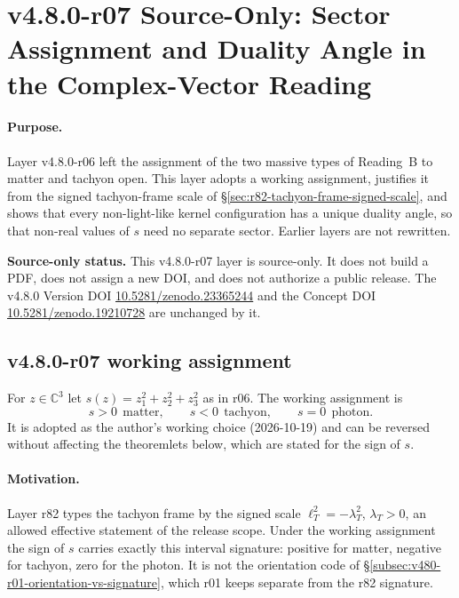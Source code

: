 
\clearpage
\section*{v4.8.0-r07 Source-Only: Sector Assignment and Duality Angle in the Complex-Vector Reading}
\label{sec:v480-r07-sector-assignment}

\paragraph{Purpose.}
Layer v4.8.0-r06 left the assignment of the two massive types of Reading~B to matter and tachyon
open.  This layer adopts a working assignment, justifies it from the signed tachyon-frame scale of
\S\ref{sec:r82-tachyon-frame-signed-scale}, and shows that every non-light-like kernel configuration
has a unique duality angle, so that non-real values of \(s\) need no separate sector.  Earlier
layers are not rewritten.

\noindent\textbf{Source-only status.}
This v4.8.0-r07 layer is source-only.  It does not build a PDF, does not assign a new DOI,
and does not authorize a public release.  The v4.8.0 Version DOI
\href{https://doi.org/10.5281/zenodo.23365244}{10.5281/zenodo.23365244} and the Concept DOI
\href{https://doi.org/10.5281/zenodo.19210728}{10.5281/zenodo.19210728} are unchanged by it.

\subsection*{v4.8.0-r07 working assignment}
\label{subsec:v480-r07-assignment}

For \(z\in\mathbb C^3\) let \(s(z)=z_1^2+z_2^2+z_3^2\) as in r06.  The working assignment is
\[
s>0\ \ \text{matter},\qquad s<0\ \ \text{tachyon},\qquad s=0\ \ \text{photon}.
\]
It is adopted as the author's working choice (2026-10-19) and can be reversed without affecting
the theoremlets below, which are stated for the sign of \(s\).

\paragraph{Motivation.}
Layer r82 types the tachyon frame by the signed scale \(\ell_T^2=-\lambda_T^2\), \(\lambda_T>0\),
an allowed effective statement of the release scope.  Under the working assignment the sign of
\(s\) carries exactly this interval signature: positive for matter, negative for tachyon, zero for
the photon.  It is not the orientation code of
\S\ref{subsec:v480-r01-orientation-vs-signature}, which r01 keeps separate from the r82 signature.

